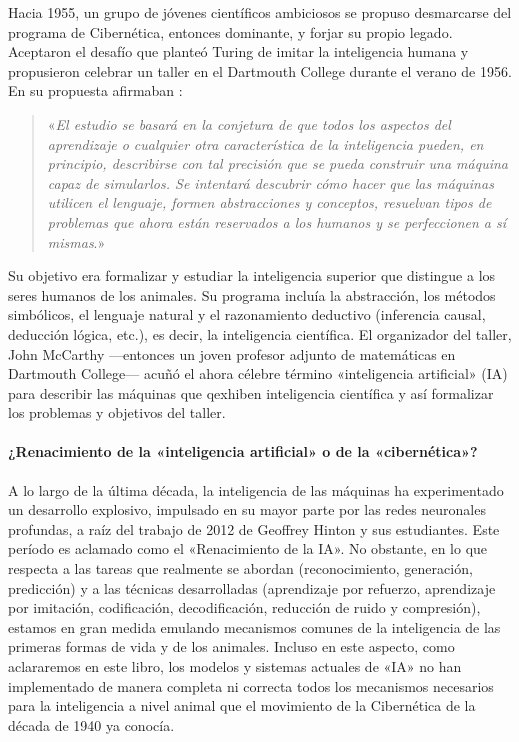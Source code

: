 \documentclass[../../book-main_es.tex]{subfiles}
\begin{document}
Hacia 1955, un grupo de jóvenes científicos ambiciosos se propuso 
desmarcarse del programa de Cibernética, entonces dominante, y forjar su 
propio legado. Aceptaron el desafío que planteó Turing 
de imitar la inteligencia humana y propusieron celebrar un taller en 
el Dartmouth College durante el verano de 1956. En su propuesta 
afirmaban \cite{McCarthy-1955}:
\begin{quote}
    «\textit{El estudio se basará en la conjetura de que
        todos los aspectos del aprendizaje o cualquier otra característica de
        la inteligencia pueden, en principio, describirse con tal precisión que
        se pueda construir una máquina capaz de simularlos. Se intentará
        descubrir cómo hacer que las máquinas utilicen el lenguaje, formen abstracciones y
        conceptos, resuelvan tipos de problemas que ahora están reservados a los humanos y
    se perfeccionen a sí mismas}.»
\end{quote}
Su objetivo era formalizar y estudiar la inteligencia superior que
distingue a los seres humanos de los animales. Su programa incluía 
la abstracción, los métodos simbólicos, el lenguaje natural y el 
razonamiento deductivo (inferencia causal, deducción lógica, etc.), 
es decir, la inteligencia científica.  El organizador del taller, 
John McCarthy ---entonces un joven profesor adjunto de 
matemáticas en Dartmouth College--- acuñó el ahora célebre término 
«inteligencia artificial» (IA) para describir las máquinas que 
qexhiben inteligencia científica y así formalizar los 
problemas y objetivos del taller.

\paragraph{¿Renacimiento de la «inteligencia artificial» o de la «cibernética»?}
A lo largo de la última década, la inteligencia de las máquinas ha experimentado
un desarrollo explosivo, impulsado en su mayor parte por las redes
neuronales profundas, a raíz del trabajo de 2012 de Geoffrey
Hinton y sus estudiantes\cite{krizhevsky2012imagenet}. Este 
período es aclamado como el «Renacimiento de la IA». No obstante, en lo que 
respecta a las tareas que realmente se abordan (reconocimiento, generación, 
predicción) y a las técnicas desarrolladas (aprendizaje por refuerzo, 
aprendizaje por imitación, codificación, decodificación, reducción de 
ruido y compresión), estamos en gran medida emulando mecanismos
comunes de la inteligencia de las primeras formas de vida y de los animales.
Incluso en este aspecto, como aclararemos en este libro, los modelos y
sistemas actuales de «IA» no han implementado de manera completa ni correcta 
todos los mecanismos necesarios para la inteligencia a nivel animal que 
el movimiento de la Cibernética de la década de 1940 ya conocía.
\end{document}
